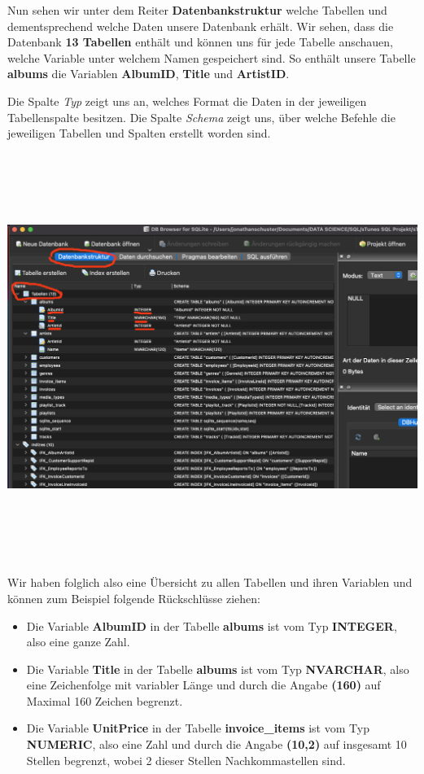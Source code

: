\documentclass[
]{book}
\providecommand{\tightlist}{%
  \setlength{\itemsep}{0pt}\setlength{\parskip}{0pt}}
\begin{document}
Nun sehen wir unter dem Reiter \textbf{Datenbankstruktur} welche Tabellen und dementsprechend welche Daten unsere Datenbank erhält. Wir sehen, dass die Datenbank \textbf{13 Tabellen} enthält und können uns für jede Tabelle anschauen, welche Variable unter welchem Namen gespeichert sind. So enthält unsere Tabelle \textbf{albums} die Variablen \textbf{AlbumID}, \textbf{Title} und \textbf{ArtistID}.

Die Spalte \emph{Typ} zeigt uns an, welches Format die Daten in der jeweiligen Tabellenspalte besitzen. Die Spalte \emph{Schema} zeigt uns, über welche Befehle die jeweiligen Tabellen und Spalten erstellt worden sind.

\includegraphics[width=\textwidth,height=5.20833in]{img-SQL-DBBrowser2.png}

Wir haben folglich also eine Übersicht zu allen Tabellen und ihren Variablen und können zum Beispiel folgende Rückschlüsse ziehen:

\begin{itemize}
\tightlist
\item
  Die Variable \textbf{AlbumID} in der Tabelle \textbf{albums} ist vom Typ \textbf{INTEGER}, also eine ganze Zahl.\\
\item
  Die Variable \textbf{Title} in der Tabelle \textbf{albums} ist vom Typ \textbf{NVARCHAR}, also eine Zeichenfolge mit variabler Länge und durch die Angabe \textbf{(160)} auf Maximal 160 Zeichen begrenzt.\\
\item
  Die Variable \textbf{UnitPrice} in der Tabelle \textbf{invoice\_items} ist vom Typ \textbf{NUMERIC}, also eine Zahl und durch die Angabe \textbf{(10,2)} auf insgesamt 10 Stellen begrenzt, wobei 2 dieser Stellen Nachkommastellen sind.
\end{itemize}
\end{document}
